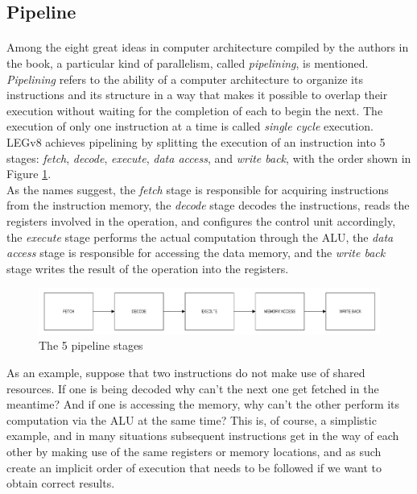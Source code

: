 \subsection{Pipeline}
\paragraph{}
Among the eight great ideas in computer architecture compiled by the authors in the book, a particular kind of  parallelism, called \emph{pipelining}, is mentioned.
\emph{Pipelining} refers to the ability of a computer architecture to organize its instructions and its structure in a way that makes it possible to overlap their execution without waiting for the completion of each to begin the next. The execution of only one instruction at a time is called \emph{single cycle} execution. LEGv8 achieves pipelining by splitting the execution of an instruction into 5 stages: \emph{fetch}, \emph{decode}, \emph{execute}, \emph{data access}, and \emph{write back}, with the order shown in Figure \ref{fig:legv8pipeline}.\\
As the names suggest, the \emph{fetch} stage is responsible for acquiring instructions from the instruction memory, the \emph{decode} stage decodes the instructions, reads the registers involved in the operation, and configures the control unit accordingly, the \emph{execute} stage performs the actual computation through the ALU, the \emph{data access} stage is responsible for accessing the data memory, and the \emph{write back} stage writes the result of the operation into the registers.
\begin{figure}[H]
	\centering
	\includegraphics[width=1\textwidth]{img/5_stage_pipeline.png}
	\caption{The 5 pipeline stages}
        \label{fig:legv8pipeline}
\end{figure}
As an example, suppose that two instructions do not make use of shared resources. If one is being decoded why can't the next one get fetched in the meantime? And if one is accessing the memory, why can't the other perform its computation via the ALU at the same time? This is, of course, a simplistic example, and in many situations subsequent instructions get in the way of each other by making use of the same registers or memory locations, and as such create an implicit order of execution that needs to be followed if we want to obtain correct results.
